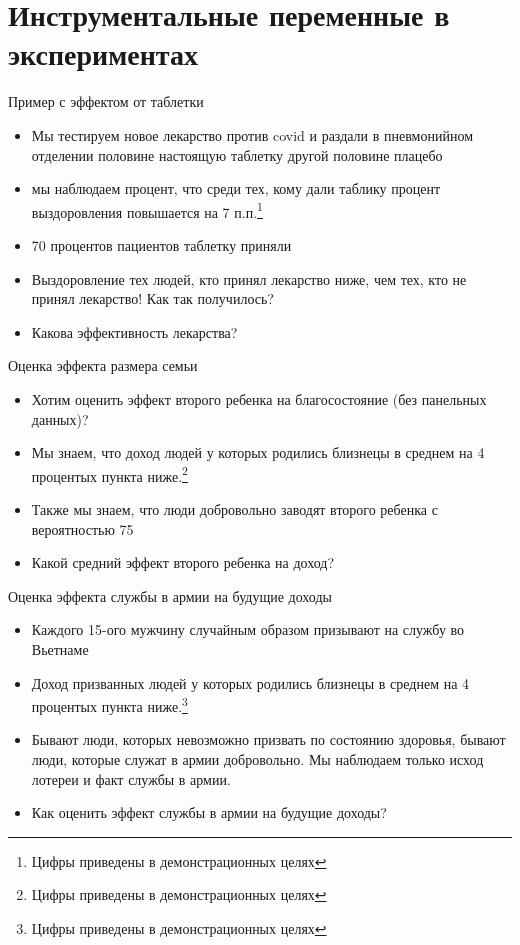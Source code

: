 

\section{Инструментальные переменные в экспериментах}


\begin{frame}{Пример с эффектом от таблетки}
\begin{itemize}
    \item Мы тестируем новое лекарство против covid и раздали в пневмонийном отделении половине настоящую таблетку другой половине плацебо
    \item мы наблюдаем процент, что среди тех, кому дали таблику процент выздоровления повышается на 7 п.п.\footnote{Цифры приведены в демонстрационных целях}
    \item 70 процентов пациентов таблетку приняли
    \item Выздоровление тех людей, кто принял лекарство ниже, чем тех, кто не принял лекарство! Как так получилось?
    \item Какова эффективность лекарства? 
\end{itemize}
\end{frame}

\begin{frame}{Оценка эффекта размера семьи}
\begin{itemize}
    \item Хотим оценить эффект второго ребенка на благосостояние (без панельных данных)?
    \item Мы знаем, что доход людей у которых родились близнецы в среднем на 4 процентых пункта ниже.\footnote{Цифры приведены в демонстрационных целях}
    \item Также мы знаем, что люди добровольно заводят второго ребенка с вероятностью 75%
    \item Какой средний эффект второго ребенка на доход? 
\end{itemize}
\end{frame}

\begin{frame}{Оценка эффекта службы в армии на будущие доходы}
\begin{itemize}
    \item Каждого 15-ого мужчину случайным образом призывают на службу во Вьетнаме
    \item Доход призванных людей у которых родились близнецы в среднем на 4 процентых пункта ниже.\footnote{Цифры приведены в демонстрационных целях}
    \item Бывают люди, которых невозможно призвать по состоянию здоровья, бывают люди, которые служат в армии добровольно. Мы наблюдаем только исход лотереи и факт службы в армии.
    \item Как оценить эффект службы в армии на будущие доходы?
\end{itemize}
\end{frame}

